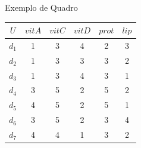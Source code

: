 \begin{quadro}[htb]
  \begin{center}
    \caption{Exemplo de Quadro} 
    \label{tab:exemplo}
    \vspace{0.2cm}
    \footnotesize
    \begin{tabular}{|c|c|c|c|c|c|}
      \hline
      $U$ & $vitA$ & $vitC$ & $vitD$ & $prot$ & $lip$ \\
      \hline
      \hline
      $d_1$ & 1 & 3 & 4 & 2 & 3\\
      $d_2$ & 1 & 3 & 3 & 3 & 2\\
      $d_3$ & 1 & 3 & 4 & 3 & 1\\
      $d_4$ & 3 & 5 & 2 & 5 & 2\\
      $d_5$ & 4 & 5 & 2 & 5 & 1\\
      $d_6$ & 3 & 5 & 2 & 3 & 4\\
      $d_7$ & 4 & 4 & 1 & 3 & 2\\
      \hline 
    \end{tabular}
  \end{center}
\end{quadro}

